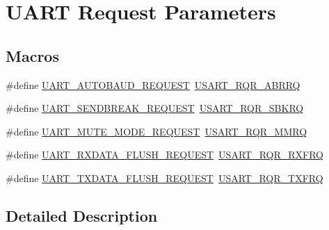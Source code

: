 \hypertarget{group___u_a_r_t___request___parameters}{}\section{U\+A\+RT Request Parameters}
\label{group___u_a_r_t___request___parameters}
\subsection*{Macros}
\begin{DoxyCompactItemize}
\item 
\#define \mbox{\hyperlink{group___u_a_r_t___request___parameters_ga8cdce81a934ab7d0c2eecb4d85300d4e}{U\+A\+R\+T\+\_\+\+A\+U\+T\+O\+B\+A\+U\+D\+\_\+\+R\+E\+Q\+U\+E\+ST}}~\mbox{\hyperlink{group___peripheral___registers___bits___definition_gad261e1474dfb5329b5520e22790b026b}{U\+S\+A\+R\+T\+\_\+\+R\+Q\+R\+\_\+\+A\+B\+R\+RQ}}
\item 
\#define \mbox{\hyperlink{group___u_a_r_t___request___parameters_ga52ced88a9f4ce90f3725901cf91f38b3}{U\+A\+R\+T\+\_\+\+S\+E\+N\+D\+B\+R\+E\+A\+K\+\_\+\+R\+E\+Q\+U\+E\+ST}}~\mbox{\hyperlink{group___peripheral___registers___bits___definition_ga2d1a36c6b492c425b4e5cc94d983ecf1}{U\+S\+A\+R\+T\+\_\+\+R\+Q\+R\+\_\+\+S\+B\+K\+RQ}}
\item 
\#define \mbox{\hyperlink{group___u_a_r_t___request___parameters_gadd5f511803928fd042f7fc6ef99f9cfb}{U\+A\+R\+T\+\_\+\+M\+U\+T\+E\+\_\+\+M\+O\+D\+E\+\_\+\+R\+E\+Q\+U\+E\+ST}}~\mbox{\hyperlink{group___peripheral___registers___bits___definition_ga2aae0f4fb0a74822ce212ea7d9b8463a}{U\+S\+A\+R\+T\+\_\+\+R\+Q\+R\+\_\+\+M\+M\+RQ}}
\item 
\#define \mbox{\hyperlink{group___u_a_r_t___request___parameters_gaf2ee2d4b1bdcbc7772ddc0da89566936}{U\+A\+R\+T\+\_\+\+R\+X\+D\+A\+T\+A\+\_\+\+F\+L\+U\+S\+H\+\_\+\+R\+E\+Q\+U\+E\+ST}}~\mbox{\hyperlink{group___peripheral___registers___bits___definition_ga7b148ee7c697bbcf836648063613612a}{U\+S\+A\+R\+T\+\_\+\+R\+Q\+R\+\_\+\+R\+X\+F\+RQ}}
\item 
\#define \mbox{\hyperlink{group___u_a_r_t___request___parameters_gafecbd800f456ed666a42ac0842cd2c4b}{U\+A\+R\+T\+\_\+\+T\+X\+D\+A\+T\+A\+\_\+\+F\+L\+U\+S\+H\+\_\+\+R\+E\+Q\+U\+E\+ST}}~\mbox{\hyperlink{group___peripheral___registers___bits___definition_gaa40d2e52b5955b30c9399eb3dec769e8}{U\+S\+A\+R\+T\+\_\+\+R\+Q\+R\+\_\+\+T\+X\+F\+RQ}}
\end{DoxyCompactItemize}


\subsection{Detailed Description}


